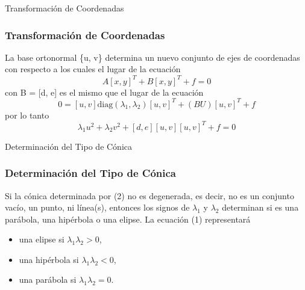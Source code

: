 \documentclass[xcolor={dvipsnames},aspectratio=169,10pt]{beamer}
\begin{document}
\begin{frame}{Transformación de Coordenadas}
  \frametitle{Transformación de Coordenadas}
  La base ortonormal \{u, v\} determina un nuevo conjunto de ejes de coordenadas con respecto a los cuales el lugar de la ecuación
  \begin{equation*}
    [x, y] A [x, y]^T + B [x, y]^T + f = 0
  \end{equation*}
  con B = [d, e] es el mismo que el lugar de la ecuación
  \begin{equation*}
    0 = [u, v] \text{diag} (\lambda_1, \lambda_2) [u, v]^T + (BU) [u, v]^T + f
  \end{equation*}
  por lo tanto
  \begin{equation*}
    \lambda_1 u^2 + \lambda_2 v^2 + [d, e] [u, v] [u, v]^T + f = 0 \tag{2}
  \end{equation*}
\end{frame}

\begin{frame}{Determinación del Tipo de Cónica}
  \frametitle{Determinación del Tipo de Cónica}
  Si la cónica determinada por (2) no es degenerada, es decir, no es un conjunto vacío, un punto, ni línea(s), entonces los signos de $\lambda_1$ y $\lambda_2$ determinan si es una parábola, una hipérbola o una elipse. La ecuación (1) representará
  \begin{itemize}
    \item una elipse si $\lambda_1\lambda_2 > 0$,
    \item una hipérbola si $\lambda_1\lambda_2 < 0$,
    \item una parábola si $\lambda_1\lambda_2 = 0$.
  \end{itemize}
\end{frame}
\end{document}
